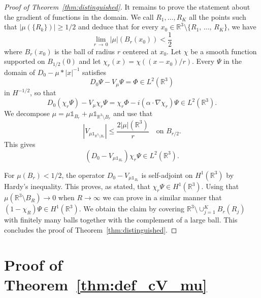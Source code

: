\documentclass[AHL,Unicode,published]{cedram}
\newcommand{\R}{\mathbb{R}}
\newcommand\1{{\ensuremath {\mathds 1} }}
\newcommand{\ii}{\infty}
\renewcommand{\geq}{\geqslant}
\renewcommand{\leq}{\leqslant}
\begin{document}
\begin{proof}[Proof of Theorem~\ref{thm:distinguished}]
It remains to prove the statement about the gradient of functions in the domain. We call $R_1,\dots,R_K$ all the points such that $|\mu(\{R_k\})|\geq1/2$ and deduce that for every $x_0\in\R^3\setminus\{R_1,\,\dots,\,R_K\}$, we have
\[
\lim_{r\,\to\,0}|\mu|(B_r(x_0))<\frac12
\]
where $B_r(x_0)$ is the ball of radius $r$ centered at $x_0$. Let $\chi$ be a smooth function supported on $B_{1/2}(0)$ and let $\chi_r(x)=\chi((x-x_0)/r)$. Every $\Psi$ in the domain of $D_0-\mu\ast|x|^{-1}$ satisfies
\[
D_0\Psi-V_\mu\Psi=\Phi\in L^2\left(\R^3\right)
\]
in $H^{-1/2}$, so that
\[
D_0\left(\chi_r\Psi\right)-V_\mu\chi_r\Psi=\chi_r\Phi-i\left(\alpha\cdot\nabla\chi_r\right)\Psi\in L^2\left(\R^3\right).
\]
We decompose $\mu=\mu\1_{B_r}+\mu\1_{\R^3\setminus B_r}$ and use that
\[
\left|V_{\mu\1_{\R^3\setminus B_r}}\right|\leq \frac{2|\mu|\left(\R^3\right)}{r}\quad\text{on }B_{r/2}.
\]
This gives
\[
\left(D_0-V_{\mu\1_{B_r}}\right)\chi_r\Psi\in L^2\left(\R^3\right).
\]

For $\mu(B_r)<1/2$, the operator $D_0-V_{\mu\1_{B_r}}$ is self-adjoint on $H^1(\R^3)$ by Hardy's inequality. This proves, as stated, that $\chi_r\Psi\in H^1(\R^3)$. Using that $\mu(\R^3\setminus B_R)\to0$ when $R\to\ii$ we can prove in a similar manner that $(1-\chi_R)\Psi\in H^1(\R^3)$. We obtain the claim by covering $\R^3\setminus\cup_{j=1}^KB_r(R_j)$ with finitely many balls together with the complement of a large ball. This concludes the proof of Theorem~\ref{thm:distinguished}.
\end{proof}



\section{Proof of Theorem~\ref{thm:def_cV_mu}}\label{sec:proof_cV_mu}
\end{document}
